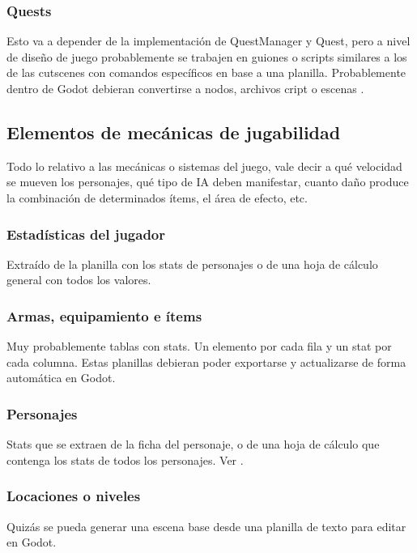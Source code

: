 \subsubsection{Quests}\label{kit:quests}
Esto va a depender de la implementación de QuestManager y Quest, pero a nivel de diseño de juego probablemente se trabajen en guiones o scripts similares a los de las cutscenes con comandos específicos en base a una planilla. Probablemente dentro de Godot debieran convertirse a nodos, archivos cript o escenas .

\subsection{Elementos de mecánicas de jugabilidad}\label{kit:elementos-de-mecanicas}
Todo lo relativo a las mecánicas o sistemas del juego, vale decir a qué velocidad se mueven los personajes, qué tipo de IA deben manifestar, cuanto daño produce la combinación de determinados ítems, el área de efecto, etc.

\subsubsection{Estadísticas del jugador}\label{kit:estadisticas-del-jugador}
Extraído de la planilla con los stats de personajes o de una hoja de cálculo general con todos los valores.

\subsubsection{Armas, equipamiento e ítems}\label{kit:armas-equipamiento-items}
Muy probablemente tablas con stats. Un elemento por cada fila y un stat por cada columna. Estas planillas debieran poder exportarse y actualizarse de forma automática en Godot.

\subsubsection{Personajes}\label{kit:personajes}
Stats que se extraen de la ficha del personaje, o de una hoja de cálculo que contenga los stats de todos los personajes. Ver .

\subsubsection{Locaciones o niveles}\label{kit:locaciones-o-niveles}
Quizás se pueda generar una escena base desde una planilla de texto para editar en Godot.

